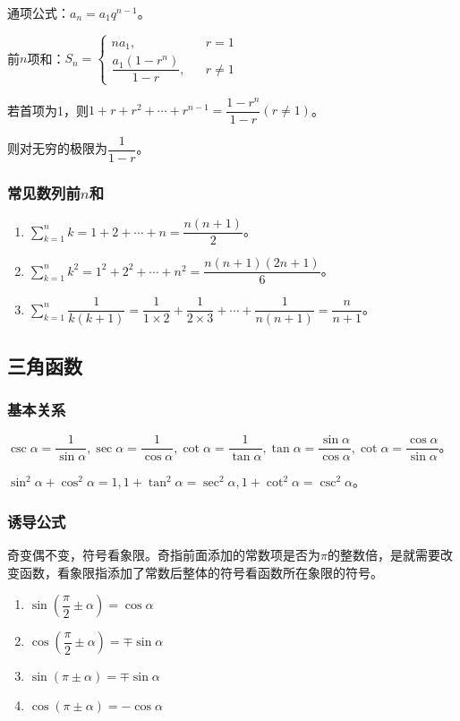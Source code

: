 \documentclass[UTF8, 12pt]{ctexart}
\begin{document}
通项公式：$a_n=a_1q^{n-1}$。

前$n$项和：$S_n=
    \left\{
    \begin{array}{lcl}
        na_1,                   &  & r=1     \\
        \dfrac{a_1(1-r^n)}{1-r}, &  & r\neq 1
    \end{array}
    \right.$

若首项为1，则$1+r+r^2+\cdots+r^{n-1}=\dfrac{1-r^n}{1-r}(r\neq 1)$。

则对无穷的极限为$\dfrac{1}{1-r}$。

\subsubsection{常见数列前\texorpdfstring{$n$}项和}

\begin{enumerate}
    \item $\sum_{k=1}^nk=1+2+\cdots+n=\dfrac{n(n+1)}{2}$。
    \item $\sum_{k=1}^nk^2=1^2+2^2+\cdots+n^2=\dfrac{n(n+1)(2n+1)}{6}$。
    \item $\sum_{k=1}^n\dfrac{1}{k(k+1)}=\dfrac{1}{1\times 2}+\dfrac{1}{2\times 3}+\cdots+\dfrac{1}{n(n+1)}=\dfrac{n}{n+1}$。
\end{enumerate}

\subsection{三角函数}

\subsubsection{基本关系}

$\csc\alpha=\dfrac{1}{\sin\alpha},\sec\alpha=\dfrac{1}{\cos\alpha},\cot\alpha=\dfrac{1}{\tan\alpha},\tan\alpha=\dfrac{\sin\alpha}{\cos\alpha},\cot\alpha=\dfrac{\cos\alpha}{\sin\alpha}$。

$\sin^2\alpha+\cos^2\alpha=1,1+\tan^2\alpha=\sec^2\alpha,1+\cot^2\alpha=\csc^2\alpha$。

\subsubsection{诱导公式}

奇变偶不变，符号看象限。奇指前面添加的常数项是否为$\pi$的整数倍，是就需要改变函数，看象限指添加了常数后整体的符号看函数所在象限的符号。

\begin{enumerate}
    \item $\sin(\dfrac{\pi}{2}\pm\alpha)=\cos\alpha$
    \item $\cos(\dfrac{\pi}{2}\pm\alpha)=\mp\sin\alpha$
    \item $\sin(\pi\pm\alpha)=\mp\sin\alpha$
    \item $\cos(\pi\pm\alpha)=-\cos\alpha$
\end{enumerate}
\end{document}
